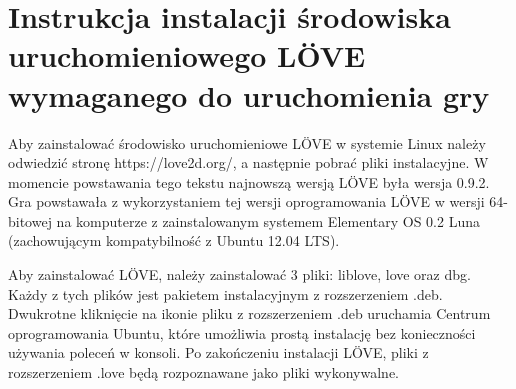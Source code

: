 \chapter{Instrukcja instalacji środowiska uruchomieniowego LÖVE wymaganego do uruchomienia gry}
Aby zainstalować środowisko uruchomieniowe LÖVE w systemie Linux należy 
odwiedzić stronę https://love2d.org/, a następnie pobrać pliki instalacyjne.
W momencie powstawania tego tekstu najnowszą wersją LÖVE była wersja 0.9.2.
Gra powstawała z wykorzystaniem tej wersji oprogramowania LÖVE w wersji 
64-bitowej na komputerze z zainstalowanym systemem Elementary OS 0.2 Luna 
(zachowującym kompatybilność z Ubuntu 12.04 LTS).

Aby zainstalować LÖVE, należy zainstalować 3 pliki: liblove, love oraz dbg.
Każdy z tych plików jest pakietem instalacyjnym z rozszerzeniem .deb.
Dwukrotne kliknięcie na ikonie pliku z rozszerzeniem .deb uruchamia 
Centrum oprogramowania Ubuntu, które umożliwia prostą instalację bez 
konieczności używania poleceń w konsoli. Po zakończeniu instalacji LÖVE, pliki 
z rozszerzeniem .love będą rozpoznawane jako pliki wykonywalne.